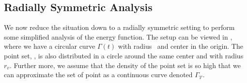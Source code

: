 \begin{comment}
We see from \eqref{eq:model1-pde} that the curve will have an inward velocity dependent on the distance to the point set and the curvature. In order to draw the curve towards the point set, the sign function $\sigma$ must be positive when the curve is outside the point set. In that case the distance term is contributing to the inward velocity. 

In the opposite case, when the curve is on the inside, the distance term should contribute to an outward-pointing velocity. This meaning $\sigma(\mathbf{x}, t)$ must be negative. Thus the sign function is clearly defined when the whole curve is outside or inside the point set. When parts of the curve is inside, and other parts are outside of the point set, or when it is hard to define what is outside and inside, this is more complex. 

Claisse and Frey makes no mention of what is done when this is the case, other than that the sign function must be defined locally. Hence, it must be both space and time-dependent. We have made a choice regarding the sign function and decided that the value of the sign function should be dependent on whether or not the closest point in the point set is inside or outside the curve. 

This in practice, means that the curve will always be attracted to the closest point in the point set, which seems like a natural choice because the distance function also is the distance to the same point. 
\end{comment}
\subsection{Radially Symmetric Analysis}
We now reduce the situation down to a radially symmetric setting to perform some simplified analysis of the energy function. The setup can be viewed in , where we have a circular curve $\Gamma(t)$ with radius \radgamma\ and center in the origin. The point set, \pointset, is also distributed in a circle around the same center and with radius $r_v$. Further more, we assume that the density of the point set is so high that we can approximate the set of point as a continuous curve denoted $\Gamma_{\mathcal{V}}$.

